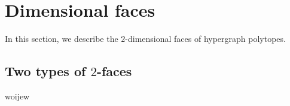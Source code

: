 
\section{Dimensional faces} 
\label{s:2faces}

In this section, we describe the $2$-dimensional faces of hypergraph polytopes.


\subsection{Two types of $2$-faces}
woijew





